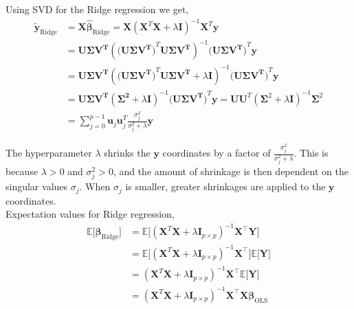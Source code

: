 \documentclass[a4paper,12pt]{article}
\begin{document}
\noindent
Using SVD for the Ridge regression we get,
\begin{equation} \label{eq1}
\begin{split}
\tilde{\boldsymbol{y}}_{\mathrm{Ridge}}&=\boldsymbol{X}\hat{\boldsymbol{\beta}}_{\mathrm{Ridge}} =\boldsymbol{X}\left(\boldsymbol{X}^T\boldsymbol{X}+\lambda\boldsymbol{I}\right)^{-1}\boldsymbol{X}^T\boldsymbol{y}\\
&= \boldsymbol{\boldsymbol{U}\boldsymbol{\Sigma}\boldsymbol{V}^T}\left(\boldsymbol{\big(\boldsymbol{U}\boldsymbol{\Sigma}\boldsymbol{V}^T\big)}^T\boldsymbol{\boldsymbol{U}\boldsymbol{\Sigma}\boldsymbol{V}^T}\right)^{-1}\boldsymbol{\big(\boldsymbol{U}\boldsymbol{\Sigma}\boldsymbol{V}^T\big)}^T\boldsymbol{y}\\
&=\boldsymbol{\boldsymbol{U}\boldsymbol{\Sigma}\boldsymbol{V}^T}\left(\boldsymbol{\big(\boldsymbol{U}\boldsymbol{\Sigma}\boldsymbol{V}^T\big)}^T\boldsymbol{\boldsymbol{U}\boldsymbol{\Sigma}\boldsymbol{V}^T} + \lambda\boldsymbol{I}\right)^{-1}\boldsymbol{\big(\boldsymbol{U}\boldsymbol{\Sigma}\boldsymbol{V}^T\big)}^T\boldsymbol{y}\\
&=\boldsymbol{\boldsymbol{U}\boldsymbol{\Sigma}\boldsymbol{V}^T}\left(\boldsymbol{\boldsymbol{\Sigma^2}}+\lambda\boldsymbol{I}\right)^{-1}\boldsymbol{\big(\boldsymbol{U}\boldsymbol{\Sigma}\boldsymbol{V}^T\big)}^T\boldsymbol{y}=\boldsymbol{U}\boldsymbol{U}^T(\boldsymbol{\Sigma}^2+\lambda\boldsymbol{I})^{-1}\boldsymbol{\Sigma}^2\\
&=\sum_{j=0}^{p-1}\boldsymbol{u}_j\boldsymbol{u}_j^T\frac{\sigma_j^2}{\sigma_j^2+\lambda}\boldsymbol{y}
\end{split}
\end{equation}

\noindent
The hyperparameter $\lambda$ shrinks the $\boldsymbol{y}$ coordinates by a factor of $\frac{\sigma_j^2}{\sigma_j^2+\lambda}$. This is because $\lambda>0$ and $\sigma_j^2>0$, and the amount of shrinkage is then dependent on the singular values $\sigma_j$. When $\sigma_j$ is smaller, greater shrinkages are applied to the $\boldsymbol{y}$ coordinates.\\


\noindent
Expectation values for Ridge regression,
\begin{equation} \label{eq1}
\begin{split}
\mathbb{E} \big[ \boldsymbol{\beta}_{\mathrm{Ridge}} \big]&=\mathbb{E} \big[(\mathbf{X}^{T} \mathbf{X} + \lambda \mathbf{I}_{p \times p})^{-1} \mathbf{X}^{\top} \mathbf{Y}\big]\\ 
& =\mathbb{E} \big[(\mathbf{X}^{T} \mathbf{X} + \lambda \mathbf{I}_{p \times p})^{-1} \mathbf{X}^{\top}\big] \mathbb{E} \big[\mathbf{Y}\big]\\
& =(\mathbf{X}^{T} \mathbf{X} + \lambda \mathbf{I}_{p \times p})^{-1} \mathbf{X}^{\top} \mathbb{E} \big[\mathbf{Y}\big]\\
& =(\mathbf{X}^{T} \mathbf{X} + \lambda \mathbf{I}_{p \times p})^{-1} \mathbf{X}^{\top} \mathbf{X}\boldsymbol{\beta}_{\mathrm{OLS}}
\end{split}
\end{equation}
\end{document}

